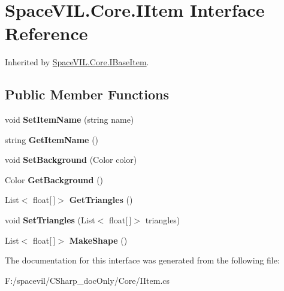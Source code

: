 \hypertarget{interface_space_v_i_l_1_1_core_1_1_i_item}{}\section{Space\+V\+I\+L.\+Core.\+I\+Item Interface Reference}
\label{interface_space_v_i_l_1_1_core_1_1_i_item}


Inherited by \mbox{\hyperlink{interface_space_v_i_l_1_1_core_1_1_i_base_item}{Space\+V\+I\+L.\+Core.\+I\+Base\+Item}}.

\subsection*{Public Member Functions}
\begin{DoxyCompactItemize}
\item 
\mbox{\label{interface_space_v_i_l_1_1_core_1_1_i_item_ada5e10f25cf0acda62a9f83184a04617}} 
void {\bfseries Set\+Item\+Name} (string name)
\item 
\mbox{\label{interface_space_v_i_l_1_1_core_1_1_i_item_a67b78de67aee0b0c8d7c356541619f43}} 
string {\bfseries Get\+Item\+Name} ()
\item 
\mbox{\label{interface_space_v_i_l_1_1_core_1_1_i_item_a6ef6ca119a20f020431423b37ec9dc44}} 
void {\bfseries Set\+Background} (Color color)
\item 
\mbox{\label{interface_space_v_i_l_1_1_core_1_1_i_item_a4a959d4143cd1c7af29d529d31e9818d}} 
Color {\bfseries Get\+Background} ()
\item 
\mbox{\label{interface_space_v_i_l_1_1_core_1_1_i_item_a0df7980826ba9f28f5db3860caee1546}} 
List$<$ float\mbox{[}$\,$\mbox{]}$>$ {\bfseries Get\+Triangles} ()
\item 
\mbox{\label{interface_space_v_i_l_1_1_core_1_1_i_item_af06da4b3b45e6ef2718d6d431bf1d868}} 
void {\bfseries Set\+Triangles} (List$<$ float\mbox{[}$\,$\mbox{]}$>$ triangles)
\item 
\mbox{\label{interface_space_v_i_l_1_1_core_1_1_i_item_a2291723c86bdcff51721758f724526e5}} 
List$<$ float\mbox{[}$\,$\mbox{]}$>$ {\bfseries Make\+Shape} ()
\end{DoxyCompactItemize}


The documentation for this interface was generated from the following file\+:\begin{DoxyCompactItemize}
\item 
F\+:/spacevil/\+C\+Sharp\+\_\+doc\+Only/\+Core/I\+Item.\+cs\end{DoxyCompactItemize}
